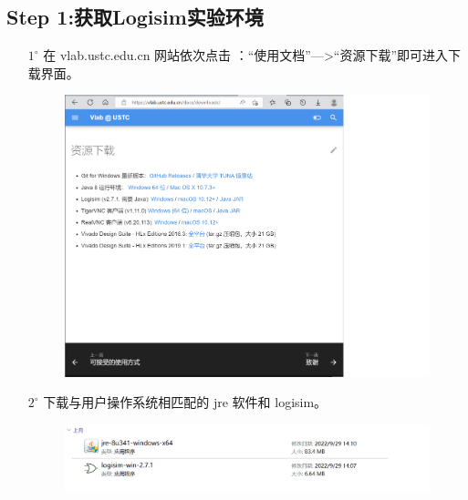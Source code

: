 \documentclass{article}
\begin{document}
        \subsection*{Step 1:获取Logisim实验环境}
		\begin{enumerate}
			\item [$1^\circ$]在 vlab.ustc.edu.cn 网站依次点击
			：“使用文档”—>“资源下载”即可进入下载界面。
			\begin{figure}[H]
				\centering
				\includegraphics[scale=0.4]{b-0.png}
			\end{figure}
			\item [$2^\circ$]下载与用户操作系统相匹配的 jre 软件和 logisim。
			\begin{figure}[H]
				\centering
				\includegraphics[scale=0.6]{b-1.png}
			\end{figure}
		\end{enumerate}
\end{document}
